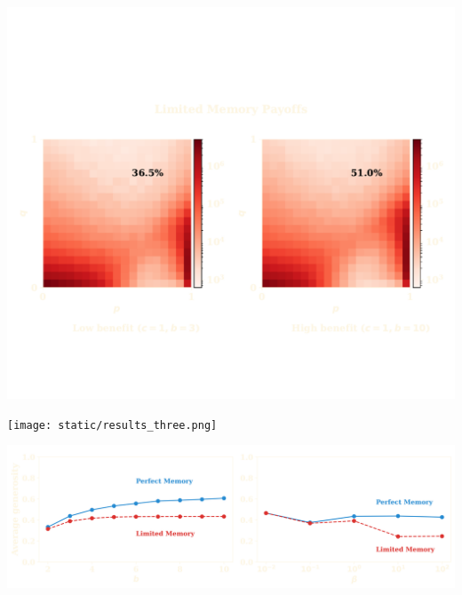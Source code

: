 \documentclass{beamer}
\begin{document}
\begin{frame}
    \centering
    
\end{frame}

\begin{frame}
    \centering
    
\end{frame}

\begin{frame}
    \centering
    
\end{frame}

\begin{frame}
    \centering
    \includegraphics[width=\textwidth]{static/results_two.pdf}
\end{frame}

\begin{frame}
    \centering
    \texttt{[image: static/results\_three.png]}
\end{frame}

\begin{frame}
    \centering
    \includegraphics[width=\textwidth]{static/results_four.png}
\end{frame}
\end{document}
